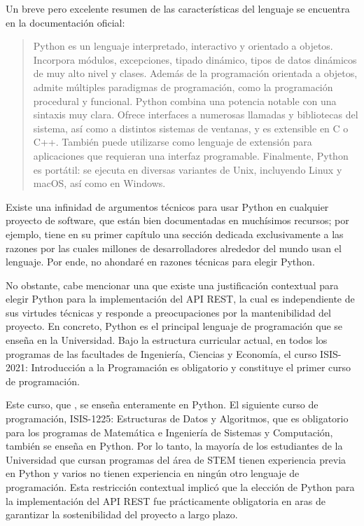 Un breve pero excelente resumen de las características del lenguaje se encuentra en la documentación oficial:
\begin{quote}
	\gls{Python} es un lenguaje interpretado, interactivo y orientado a objetos. Incorpora módulos, excepciones, tipado dinámico, tipos de datos dinámicos de muy alto nivel y clases. Además de la programación orientada a objetos, admite múltiples paradigmas de programación, como la programación procedural y funcional. \gls{Python} combina una potencia notable con una sintaxis muy clara. Ofrece interfaces a numerosas llamadas y bibliotecas del sistema, así como a distintos sistemas de ventanas, y es extensible en C o C++. También puede utilizarse como lenguaje de extensión para aplicaciones que requieran una interfaz programable. Finalmente, \gls{Python} es portátil: se ejecuta en diversas variantes de Unix, incluyendo Linux y macOS, así como en Windows. \cite{python_official_docs}
\end{quote} %
\noindent Existe una infinidad de argumentos técnicos para usar \gls{Python} en cualquier proyecto de software, que están bien documentadas en muchísimos recursos; por ejemplo, \cite{learning_python} tiene en su primer capítulo una sección dedicada exclusivamente a las razones por las cuales millones de desarrolladores alrededor del mundo usan el lenguaje. Por ende, no ahondaré en razones técnicas para elegir \gls{Python}.

No obstante, cabe mencionar una que existe una justificación contextual para elegir \gls{Python} para la implementación del \gls{API REST}, la cual es independiente de sus virtudes técnicas y responde a preocupaciones por la mantenibilidad del proyecto. En concreto, \gls{Python} es el principal lenguaje de programación que se enseña en la Universidad. Bajo la estructura curricular actual, en todos los programas de las facultades de Ingeniería, Ciencias y Economía, el curso ISIS-2021: Introducción a la Programación es obligatorio y constituye el primer curso de programación. %

Este curso, que  \cite{ip}, se enseña enteramente en \gls{Python}. El siguiente curso de programación, ISIS-1225: Estructuras de Datos y Algoritmos, que es obligatorio para los programas de Matemática e Ingeniería de Sistemas y Computación, también se enseña en \gls{Python}. %
Por lo tanto, la mayoría de los estudiantes de la Universidad que cursan programas del área de STEM tienen experiencia previa en \gls{Python} y varios no tienen experiencia en ningún otro lenguaje de programación. Esta restricción contextual implicó que la elección de \gls{Python} para la implementación del \gls{API REST} fue prácticamente obligatoria en aras de garantizar la sostenibilidad del proyecto a largo plazo.

